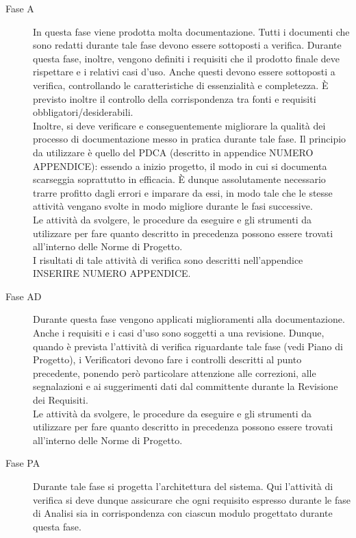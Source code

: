 	\begin{description}
		\item[Fase A] In questa fase viene prodotta molta documentazione. Tutti i documenti che sono redatti durante tale fase devono essere 
		sottoposti a verifica. Durante questa fase, inoltre, vengono definiti i requisiti che il prodotto finale deve rispettare e i relativi casi 
		d'uso. Anche questi devono essere sottoposti a verifica, controllando le caratteristiche di essenzialità e completezza. È previsto inoltre 
		il controllo della corrispondenza tra fonti e requisiti obbligatori/desiderabili.\\
		Inoltre, si deve verificare e conseguentemente migliorare la qualità dei processo di documentazione messo in pratica durante tale fase. Il 
		principio da utilizzare è quello del PDCA (descritto in appendice NUMERO APPENDICE): essendo a inizio progetto, il modo in cui si documenta 
		scarseggia soprattutto in efficacia. È dunque assolutamente necessario trarre profitto dagli errori e imparare da essi, in modo tale che le 
		stesse attività vengano svolte in modo migliore durante le fasi successive.\\
		Le attività da svolgere, le procedure da eseguire e gli strumenti da utilizzare per fare quanto descritto in precedenza possono essere trovati 
		all'interno delle Norme di Progetto.\\
		I risultati di tale attività di verifica sono descritti nell'appendice INSERIRE NUMERO APPENDICE.
		\item[Fase AD] Durante questa fase vengono applicati miglioramenti alla documentazione. Anche i requisiti e i casi d'uso 
		sono soggetti a una revisione. Dunque, quando è prevista l'attività di verifica riguardante tale fase (vedi Piano di Progetto), i Verificatori 
		devono fare i controlli descritti al punto precedente, ponendo però particolare attenzione alle correzioni, alle segnalazioni e ai suggerimenti 
		dati dal committente durante la Revisione dei Requisiti.\\
		Le attività da svolgere, le procedure da eseguire e gli strumenti da utilizzare per fare quanto descritto in precedenza possono essere trovati 
		all'interno delle Norme di Progetto.
		\item[Fase PA] Durante tale fase si progetta l'architettura del sistema. Qui l'attività di verifica si deve dunque assicurare che ogni requisito 
		espresso durante le fase di Analisi sia in corrispondenza con ciascun modulo progettato durante questa fase.\\

\end{description}
